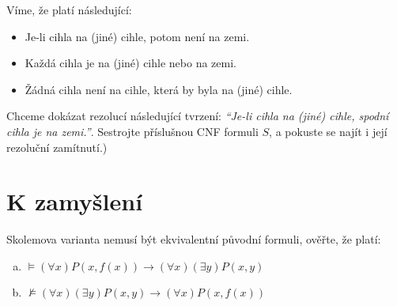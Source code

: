 \medskip\begin{problem} Víme, že platí následující:
    \begin{itemize}\it
        \item Je-li cihla na (jiné) cihle, potom není na zemi.
        \item Každá cihla je na (jiné) cihle nebo na zemi.
        \item Žádná cihla není na cihle, která by byla na (jiné) cihle.
    \end{itemize}
    Chceme dokázat rezolucí následující tvrzení: {\it ``Je-li cihla na (jiné) cihle, spodní cihla je na zemi.''}. Sestrojte příslušnou CNF formuli $S$, a pokuste se najít i její rezoluční zamítnutí.)
\end{problem}

        
\section*{K zamyšlení}

    
\begin{problem} 
    
    Skolemova varianta nemusí být ekvivalentní původní formuli, ověřte, že platí:
    \begin{enumerate}[(a)]
        \item $\models (\forall x)P(x,f(x)) \to (\forall x)(\exists y)P(x,y)$
        \item $\not\models (\forall x)(\exists y)P(x,y)\to (\forall x)P(x,f(x))$
    \end{enumerate}

\end{problem}















 


